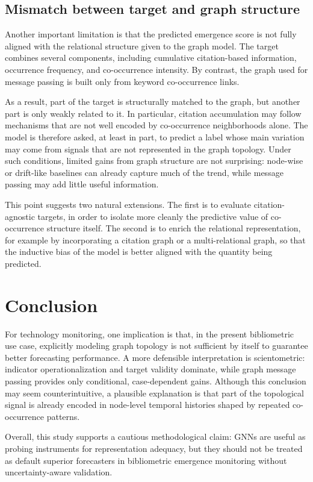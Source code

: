 \documentclass[pdflatex,sn-basic]{sn-jnl}
\begin{document}
\subsection{Mismatch between target and graph structure}
Another important limitation is that the predicted emergence score is not fully aligned with the relational structure given to the graph model. The target combines several components, including cumulative citation-based information, occurrence frequency, and co-occurrence intensity. By contrast, the graph used for message passing is built only from keyword co-occurrence links.

As a result, part of the target is structurally matched to the graph, but another part is only weakly related to it. In particular, citation accumulation may follow mechanisms that are not well encoded by co-occurrence neighborhoods alone. The model is therefore asked, at least in part, to predict a label whose main variation may come from signals that are not represented in the graph topology. Under such conditions, limited gains from graph structure are not surprising: node-wise or drift-like baselines can already capture much of the trend, while message passing may add little useful information.

This point suggests two natural extensions. The first is to evaluate citation-agnostic targets, in order to isolate more cleanly the predictive value of co-occurrence structure itself. The second is to enrich the relational representation, for example by incorporating a citation graph or a multi-relational graph, so that the inductive bias of the model is better aligned with the quantity being predicted.

\section{Conclusion}
For technology monitoring, one implication is that, in the present bibliometric use case, explicitly modeling graph topology is not sufficient by itself to guarantee better forecasting performance. A more defensible interpretation is scientometric: indicator operationalization and target validity dominate, while graph message passing provides only conditional, case-dependent gains. Although this conclusion may seem counterintuitive, a plausible explanation is that part of the topological signal is already encoded in node-level temporal histories shaped by repeated co-occurrence patterns.

Overall, this study supports a cautious methodological claim: GNNs are useful as probing instruments for representation adequacy, but they should not be treated as default superior forecasters in bibliometric emergence monitoring without uncertainty-aware validation.
\end{document}

